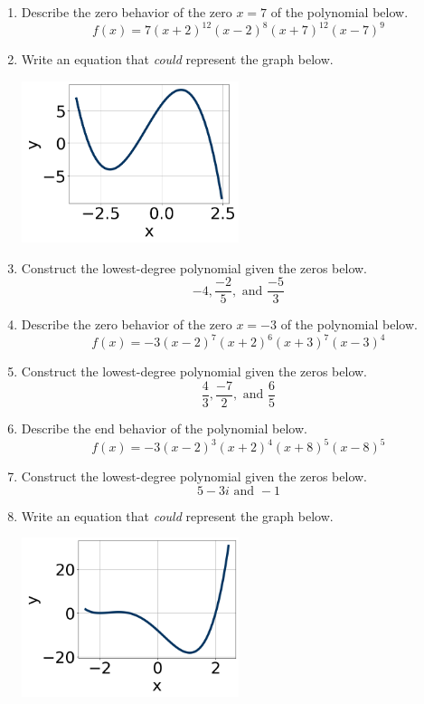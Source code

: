 \documentclass[14pt]{extbook}
\begin{document}
\begin{enumerate}
\item{
Describe the zero behavior of the zero $x = 7$ of the polynomial below.\[ f(x) = 7(x + 2)^{12}(x - 2)^{8}(x + 7)^{12}(x - 7)^{9} \]} \newpage
\item{
Write an equation that \textit{could} represent the graph below.
\begin{center}
    \includegraphics[width=0.5\textwidth]{../Figures/polyGraphToFunctionA.png}
\end{center}
} \newpage
\item{
Construct the lowest-degree polynomial given the zeros below.\[ -4, \frac{-2}{5}, \text{ and } \frac{-5}{3} \]} \newpage
\item{
Describe the zero behavior of the zero $x = -3$ of the polynomial below.\[ f(x) = -3(x - 2)^{7}(x + 2)^{6}(x + 3)^{7}(x - 3)^{4} \]} \newpage
\item{
Construct the lowest-degree polynomial given the zeros below.\[ \frac{4}{3}, \frac{-7}{2}, \text{ and } \frac{6}{5} \]} \newpage
\item{
Describe the end behavior of the polynomial below.\[ f(x) = -3(x - 2)^{3}(x + 2)^{4}(x + 8)^{5}(x - 8)^{5} \]} \newpage
\item{
Construct the lowest-degree polynomial given the zeros below.\[ 5 - 3 i \text{ and } -1 \]} \newpage
\item{
Write an equation that \textit{could} represent the graph below.
\begin{center}
    \includegraphics[width=0.5\textwidth]{../Figures/polyGraphToFunctionCopyA.png}

\end{center}}
\end{enumerate}
\end{document}

